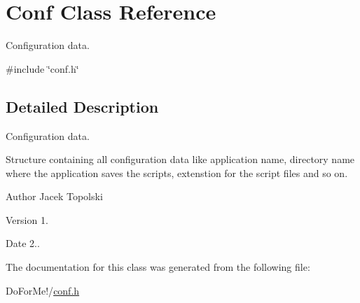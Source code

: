 \hypertarget{class_conf}{\section{Conf Class Reference}
\label{class_conf}
}


Configuration data.  




{\ttfamily \#include \char`\"{}conf.\-h\char`\"{}}



\subsection{Detailed Description}
Configuration data. 

Structure containing all configuration data like application name, directory name where the application saves the scripts, extenstion for the script files and so on. \begin{DoxyAuthor}{Author}
Jacek Topolski 
\end{DoxyAuthor}
\begin{DoxyVersion}{Version}
1. 
\end{DoxyVersion}
\begin{DoxyDate}{Date}
2.. 
\end{DoxyDate}


The documentation for this class was generated from the following file\-:\begin{DoxyCompactItemize}
\item 
Do\-For\-Me!/\hyperlink{conf_8h}{conf.\-h}\end{DoxyCompactItemize}
